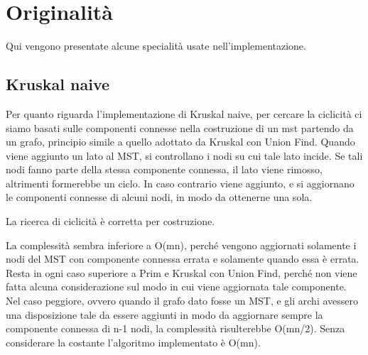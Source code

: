 \chapter{Originalità\label{sec:originalita}}
\noindent Qui vengono presentate alcune specialità usate nell'implementazione.

\section{Kruskal naive\label{sec:originalitanaives}}

Per quanto riguarda l'implementazione di Kruskal naive, per cercare la ciclicità ci siamo basati sulle componenti connesse nella costruzione di un mst partendo da un grafo, principio simile a quello adottato da Kruskal con Union Find.
Quando viene aggiunto un lato al MST, si controllano i nodi su cui tale lato incide.
Se tali nodi fanno parte della stessa componente connessa, il lato viene rimosso, altrimenti formerebbe un ciclo.
In caso contrario viene aggiunto, e si aggiornano le componenti connesse di alcuni nodi, in modo da ottenerne una sola.

La ricerca di ciclicità è corretta per costruzione.

La complessità sembra inferiore a O(mn), perché vengono aggiornati solamente i nodi del MST con componente connessa errata e solamente quando essa è errata.
Resta in ogni caso superiore a Prim e Kruskal con Union Find, perché non viene fatta alcuna considerazione sul modo in cui viene aggiornata tale componente.
Nel caso peggiore, ovvero quando il grafo dato fosse un MST, e gli archi avessero una disposizione tale da essere aggiunti in modo da aggiornare sempre la componente connessa di n-1 nodi, la complessità risulterebbe O(mn/2).
Senza considerare la costante l'algoritmo implementato è O(mn).
